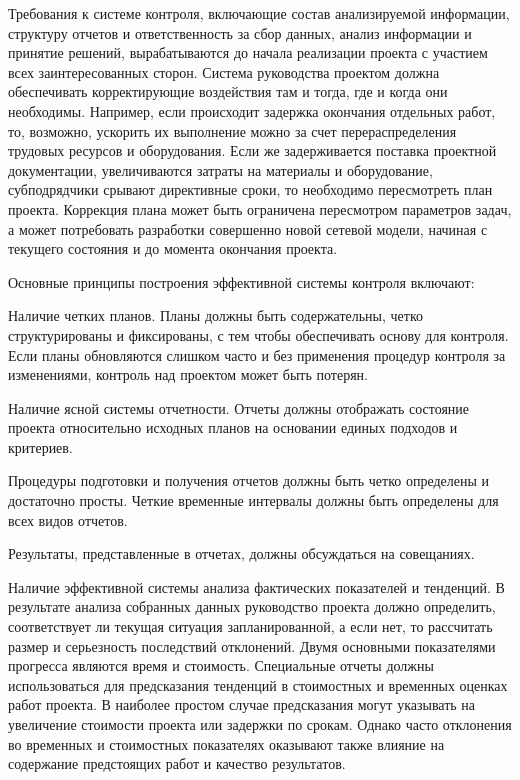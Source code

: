 Требования к системе контроля, включающие состав анализируемой информации, структуру отчетов и ответственность за сбор данных, анализ информации и принятие решений, вырабатываются до начала реализации проекта с участием всех заинтересованных сторон.
Система руководства проектом должна обеспечивать корректирующие воздействия там и тогда, где и когда они необходимы.
Например, если происходит задержка окончания отдельных работ, то, возможно, ускорить их выполнение можно за счет перераспределения трудовых ресурсов и оборудования.
Если же задерживается поставка проектной документации, увеличиваются затраты на материалы и оборудование, субподрядчики срывают директивные сроки, то необходимо пересмотреть план проекта.
Коррекция плана может быть ограничена пересмотром параметров задач, а может потребовать разработки совершенно новой сетевой модели, начиная с текущего состояния и до момента окончания проекта.

Основные принципы построения эффективной системы контроля включают:

Наличие четких планов.
Планы должны быть содержательны, четко структурированы и фиксированы, с тем чтобы обеспечивать основу для контроля.
Если планы обновляются слишком часто и без применения процедур контроля за изменениями, контроль над проектом может быть потерян.

Наличие ясной системы отчетности.
Отчеты должны отображать состояние проекта относительно исходных планов на основании единых подходов и критериев.

Процедуры подготовки и получения отчетов должны быть четко определены и достаточно просты.
Четкие временные интервалы должны быть определены для всех видов отчетов.

Результаты, представленные в отчетах, должны обсуждаться на совещаниях.

Наличие эффективной системы анализа фактических показателей и тенденций.
В результате анализа собранных данных руководство проекта должно определить, соответствует ли текущая ситуация запланированной, а если нет, то рассчитать размер и серьезность последствий отклонений.
Двумя основными показателями прогресса являются время и стоимость.
Специальные отчеты должны использоваться для предсказания тенденций в стоимостных и временных оценках работ проекта.
В наиболее простом случае предсказания могут указывать на увеличение стоимости проекта или задержки по срокам.
Однако часто отклонения во временных и стоимостных показателях оказывают также влияние на содержание предстоящих работ и качество результатов.


